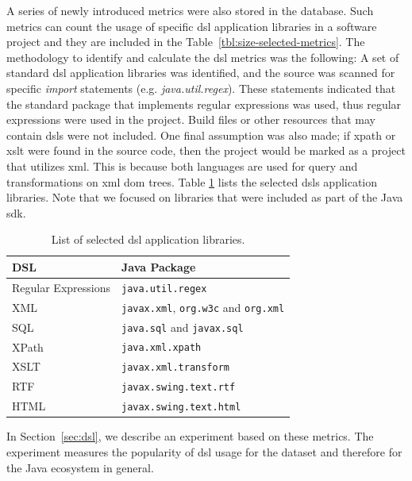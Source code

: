 \documentclass[conference]{IEEEtran}
\begin{document}
A series of newly introduced metrics were also stored in the database. Such metrics can count the usage of specific {\sc dsl} application libraries in a software project and they are included in the Table~\ref{tbl:size-selected-metrics}. The methodology to identify and calculate the {\sc dsl} metrics was the following: A set of standard {\sc dsl} application libraries was identified, and the source was scanned for specific \textit{import} statements (e.g. \textit{java.util.regex}). These statements indicated that the standard package that implements regular expressions was used, thus regular expressions were used in the project. Build files or other resources that may contain {\sc dsl}s were not included. One final assumption was also made; if {\sc xp}ath or {\sc xslt} were found in the source code, then the project would be marked as a project that utilizes {\sc xml}. This is because both languages are used for query and transformations on {\sc xml} {\sc dom} trees. Table \ref{tbl:dsl-list} lists the selected {\sc dsl}s application libraries. Note that we focused on libraries that were included as part of the Java {\sc sdk}.

\begin{table}[!t]
\centering
\caption{List of selected {\sc dsl} application libraries.}
\label{tbl:dsl-list}
\begin{tabular}{|l||l|}
 \hline
\textbf{DSL} & \textbf{Java Package}\\
\hline
Regular Expressions & \verb|java.util.regex|\\
\hline
XML & \verb|javax.xml|, \verb|org.w3c| and \verb|org.xml|\\
\hline
SQL & \verb|java.sql| and \verb|javax.sql|\\
\hline
XPath & \verb|java.xml.xpath|\\
\hline
XSLT & \verb|javax.xml.transform|\\
\hline
RTF & \verb|javax.swing.text.rtf|\\
\hline
HTML & \verb|javax.swing.text.html|\\
\hline
\end{tabular}
\end{table}

In Section~\ref{sec:dsl}, we describe an experiment based on these metrics. The experiment measures the popularity of {\sc dsl} usage for the dataset and therefore for the Java ecosystem in general.
\end{document}
